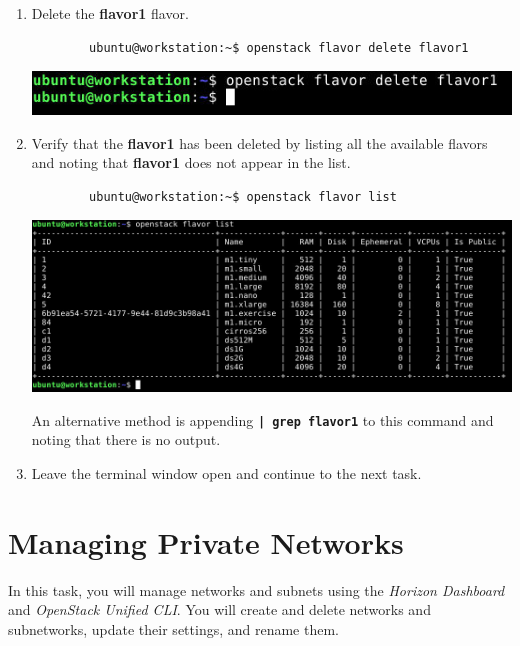 \documentclass[letterpaper, 12pt]{article}
\begin{document}
\begin{enumerate}
    \item Delete the \textbf{flavor1} flavor.
    \begin{lstlisting}
        ubuntu@workstation:~$ openstack flavor delete flavor1
    \end{lstlisting}

    \begin{center}
        \includegraphics[width=\linewidth]{images/part2/step8.png}
    \end{center}

    \item Verify that the \textbf{flavor1} has been deleted by listing all the available flavors and noting that
    \textbf{flavor1} does not appear in the list.
    \begin{lstlisting}
        ubuntu@workstation:~$ openstack flavor list    
    \end{lstlisting}

    \begin{center}
        \includegraphics[width=\linewidth]{images/part2/step9.png}
    \end{center}

    \begin{tipbox}
        An alternative method is appending \textbf{\texttt{| grep flavor1}} to this command and noting that there is no
        output.
    \end{tipbox}

    \item Leave the terminal window open and continue to the next task.
\end{enumerate}

\section{Managing Private Networks}
\label{sec:managing_private_networks}
In this task, you will manage networks and subnets using the \textit{Horizon Dashboard} and \textit{OpenStack
Unified CLI}. You will create and delete networks and subnetworks, update their settings, and rename them.
\end{document}
